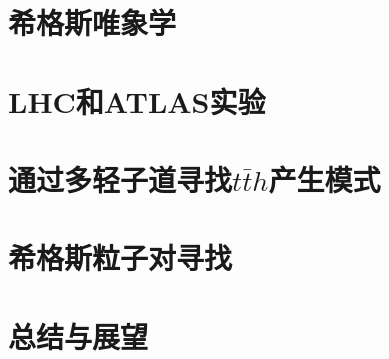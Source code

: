 
\chapter{希格斯唯象学}\label{chap:higgs_pheno}


\chapter{LHC和ATLAS实验}\label{chap:lhc_atlas}





\chapter{通过多轻子道寻找$t\bar{t}h$产生模式}\label{chap:tth_multilep}




\chapter{希格斯粒子对寻找}\label{chap:hh_serach}









\chapter{总结与展望}\label{chap:conclusions}

%
